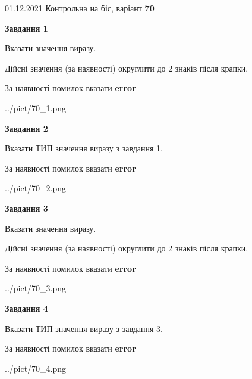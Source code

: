 \documentclass[11pt, ukrainian]{article}
\begin{document}
{01.12.2021 Контрольна на біс, варіант  \No \textbf { 70 }\par}
{
\begin {large}
{\begin {center}\textbf{Завдання 1}\end {center}}\par
Вказати значення виразу. \par
Дійсні значення (за наявності) округлити до 2 знаків після крапки. \par
За наявності помилок вказати \textbf{error}

\begin{center}
	{../pict/70_1.png}
\end{center}
\newpage

{\begin {center}\textbf{Завдання 2}\end {center}}\par
Вказати ТИП значення виразу з завдання 1. \par
За наявності помилок вказати \textbf{error}

\begin{center}
	{../pict/70_2.png}
\end{center}
\newpage

{\begin {center}\textbf{Завдання 3}\end {center}}\par
Вказати значення виразу. \par
Дійсні значення (за наявності) округлити до 2 знаків після крапки. \par
За наявності помилок вказати \textbf{error}

\begin{center}
	{../pict/70_3.png}
\end{center}
\newpage

{\begin {center}\textbf{Завдання 4}\end {center}}\par
Вказати ТИП значення виразу з завдання 3. \par
За наявності помилок вказати \textbf{error}

\begin{center}
	{../pict/70_4.png}
\end{center}
\newpage


\end{large}}
\end{document}
